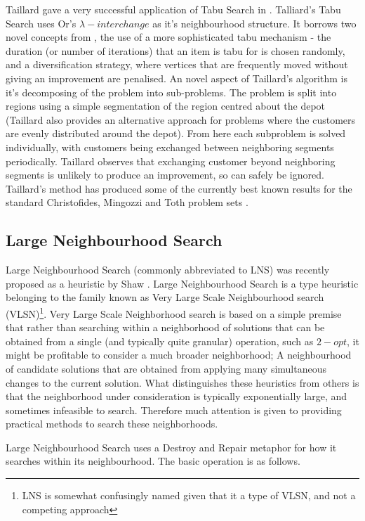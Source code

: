 Taillard gave a very successful application of Tabu Search in \cite{Taillard:1993}. Talliard's Tabu Search uses Or's $\lambda-interchange$ as it's neighbourhood structure. It borrows two novel concepts from \cite{GHL:1994}, the use of a more sophisticated tabu mechanism - the duration (or number of iterations) that an item is tabu for is chosen randomly, and a diversification strategy, where vertices that are frequently moved without giving an improvement are penalised. An novel aspect of Taillard's algorithm is it's decomposing of the problem into sub-problems. The problem is split into regions using a simple segmentation of the region centred about the depot (Taillard also provides an alternative approach for problems where the customers are evenly distributed around the depot). From here each subproblem is solved individually, with customers being exchanged between neighboring segments periodically. Taillard observes that exchanging customer beyond neighboring segments is unlikely to produce an improvement, so can safely be ignored. Taillard's method has produced some of the currently best known results for the standard Christofides, Mingozzi and Toth problem sets \cite{CMT:1981}. 

\subsection{Large Neighbourhood Search}

Large Neighbourhood Search (commonly abbreviated to LNS) was recently proposed as a heuristic by Shaw \cite{Shaw:1998}. Large Neighbourhood Search is a type heuristic belonging to the family known as Very Large Scale Neighbourhood search (VLSN)\footnote{LNS is somewhat confusingly named given that it a type of VLSN, and not a competing approach}. Very Large Scale Neighborhood search is based on a simple premise that rather than searching within a neighborhood of solutions that can be obtained from a single (and typically quite granular) operation, such as $2-opt$, it might be profitable to consider a much broader neighborhood; A neighbourhood of candidate solutions that are obtained from applying many simultaneous changes to the current solution. What distinguishes these heuristics from others is that the neighborhood under consideration is typically exponentially large, and sometimes infeasible to search. Therefore much attention is given to providing practical methods to search these neighborhoods. 

Large Neighbourhood Search uses a Destroy and Repair metaphor for how it searches within its neighbourhood. The basic operation is as follows.

